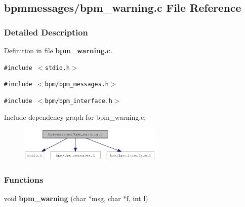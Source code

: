 \subsection{bpmmessages/bpm\_\-warning.c File Reference}
\label{bpm__warning_8c}


\subsubsection{Detailed Description}


Definition in file {\bf bpm\_\-warning.c}.

{\tt \#include $<$stdio.h$>$}\par
{\tt \#include $<$bpm/bpm\_\-messages.h$>$}\par
{\tt \#include $<$bpm/bpm\_\-interface.h$>$}\par


Include dependency graph for bpm\_\-warning.c:\nopagebreak
\begin{figure}[H]
\begin{center}
\leavevmode
\includegraphics[width=201pt]{bpm__warning_8c__incl}
\end{center}
\end{figure}
\subsubsection*{Functions}
\begin{CompactItemize}
\item 
void {\bf bpm\_\-warning} (char $\ast$msg, char $\ast$f, int l)
\end{CompactItemize}
